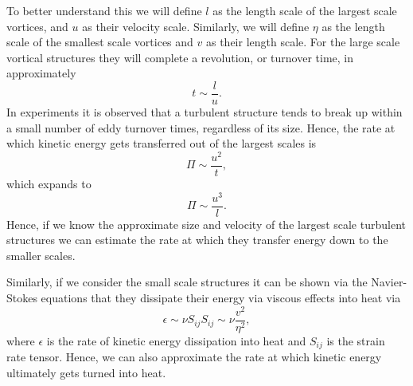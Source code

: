 To better understand this we will define $l$ as the length scale of the largest scale vortices, and $u$ as their velocity scale. Similarly, we will define $\eta$ as the length scale of the smallest scale vortices and $v$ as their length scale. For the large scale vortical structures they will complete a revolution, or turnover time, in approximately
\begin{equation}
	t \sim \frac{l}{u}.
\end{equation}
In experiments it is observed that a turbulent structure tends to break up within a small number of eddy turnover times, regardless of its size. Hence, the rate at which kinetic energy gets transferred out of the largest scales is
\begin{equation}
	\Pi \sim \frac{u^2}{t},
\end{equation}
which expands to 
\begin{equation}
	\Pi \sim \frac{u^3}{l}.
\end{equation}
Hence, if we know the approximate size and velocity of the largest scale turbulent structures we can estimate the rate at which they transfer energy down to the smaller scales.

Similarly, if we consider the small scale structures it can be shown via the Navier-Stokes equations that they dissipate their energy via viscous effects into heat via
\begin{equation}
	\epsilon \sim \nu S_{ij} S_{ij} \sim \nu \frac{v^2}{\eta^2},
\end{equation}
where $\epsilon$ is the rate of kinetic energy dissipation into heat and $S_{ij}$ is the strain rate tensor. Hence, we can also approximate the rate at which kinetic energy ultimately gets turned into heat.

